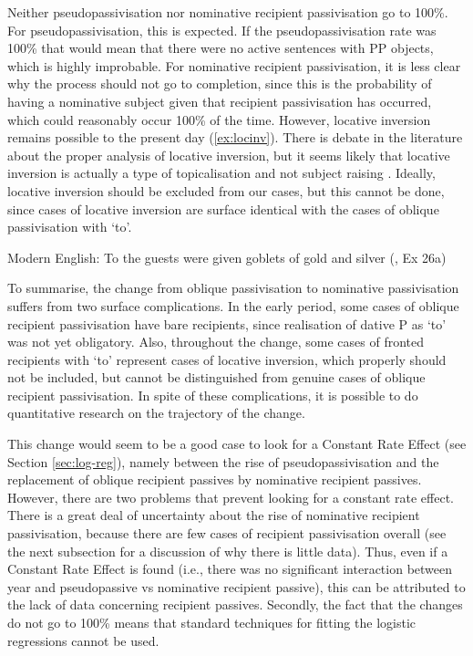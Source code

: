 	Neither pseudopassivisation nor nominative recipient passivisation go to 100\%. For pseudopassivisation, this is expected. If the pseudopassivisation rate was 100\% that would mean that there were no active sentences with PP objects, which is highly improbable. For nominative recipient passivisation, it is less clear why the process should not go to completion, since this is the probability of having a nominative subject given that recipient passivisation has occurred, which could reasonably occur 100\% of the time. However, locative inversion remains possible to the present day (\ref{ex:locinv}). There is debate in the literature about the proper analysis of locative inversion, but it seems likely that locative inversion is actually a type of topicalisation and not subject raising \citep{Bresnan.1994}. Ideally, locative inversion should be excluded from our cases, but this cannot be done, since cases of locative inversion are surface identical with the cases of oblique passivisation with `to'.

	\begin{exe}
		\ex Modern English: To the guests were given goblets of gold and silver (\citealt{Bruening.2010}, Ex 26a)\label{ex:locinv}
	\end{exe}

	To summarise, the change from oblique passivisation to nominative passivisation suffers from two surface complications. In the early period, some cases of oblique recipient passivisation have bare recipients, since realisation of dative P as `to' was not yet obligatory. Also, throughout the change, some cases of fronted recipients with `to' represent cases of locative inversion, which properly should not be included, but cannot be distinguished from genuine cases of oblique recipient passivisation. In spite of these complications, it is possible to do quantitative research on the trajectory of the change.

	This change would seem to be a good case to look for a Constant Rate Effect (see Section \ref{sec:log-reg}), namely between the rise of pseudopassivisation and the replacement of oblique recipient passives by nominative recipient passives. However, there are two problems that prevent looking for a constant rate effect. There is a great deal of uncertainty about the rise of nominative recipient passivisation, because there are few cases of recipient passivisation overall (see the next subsection for a discussion of why there is little data). Thus, even if a Constant Rate Effect is found (i.e., there was no significant interaction between year and pseudopassive vs nominative recipient passive), this can be attributed to the lack of data concerning recipient passives. Secondly, the fact that the changes do not go to 100\% means that standard techniques for fitting the logistic regressions cannot be used.


